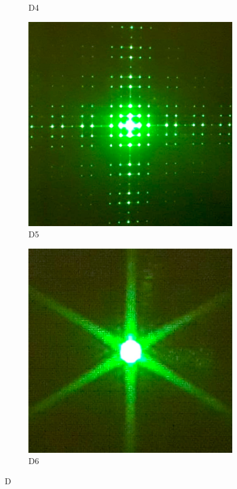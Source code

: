 \begin{figure}[H]
\begin{subfigure}[t]{.3\textwidth}
        \caption{D4}
        \label{fig:D4}
    \end{subfigure}
    \qquad
    \begin{subfigure}[t]{.3\textwidth}
        \centering
        \includegraphics[width=\textwidth]{figuras/medidas/D5.jpg}
        \caption{D5}
        \label{fig:D5}
    \end{subfigure}
    \qquad
    \begin{subfigure}[t]{.3\textwidth}
        \centering
        \includegraphics[width=\textwidth]{figuras/medidas/D6.jpg}
        \caption{D6}
        \label{fig:D6}
    \end{subfigure}

    \caption{D}
    \label{fig:D}
\end{figure}